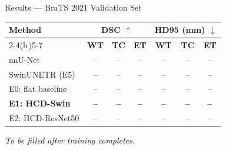 \documentclass[aspectratio=169]{beamer}
\begin{document}
\begin{frame}{Results — BraTS 2021 Validation Set}
  \vspace{0.3em}
  \begin{center}
  \begin{tabular}{lcccccc}
    \toprule
    \multirow{2}{*}{\textbf{Method}} &
    \multicolumn{3}{c}{\textbf{DSC} $\uparrow$} &
    \multicolumn{3}{c}{\textbf{HD95 (mm)} $\downarrow$} \\
    \cmidrule(lr){2-4}\cmidrule(lr){5-7}
    & \textbf{WT} & \textbf{TC} & \textbf{ET}
    & \textbf{WT} & \textbf{TC} & \textbf{ET} \\
    \midrule
    nnU-Net           & -- & -- & -- & -- & -- & -- \\
    SwinUNETR (E5)    & -- & -- & -- & -- & -- & -- \\
    E0: flat baseline & -- & -- & -- & -- & -- & -- \\
    \midrule
    \textbf{E1: HCD-Swin}    & \textbf{--} & \textbf{--} & \textbf{--} & \textbf{--} & \textbf{--} & \textbf{--} \\
    E2: HCD-ResNet50  & -- & -- & -- & -- & -- & -- \\
    \bottomrule
  \end{tabular}
  \end{center}

  \vspace{0.8em}
  \begin{center}
    \textit{To be filled after training completes.}
  \end{center}
\end{frame}
\end{document}
